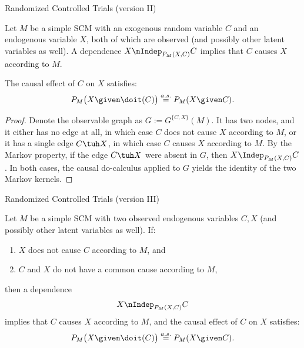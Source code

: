 \begin{frame}{Randomized Controlled Trials (version II)}
\begin{Prp}
Let $M$ be a simple SCM with an exogenous random variable $C$ and an endogenous 
variable $X$, both of which are observed (and possibly other latent variables as well).
A dependence 
  $X \nIndep_{P_{M}(X,C)} C $
implies that $C$ causes $X$ according to $M$.

The causal effect of $C$ on $X$ satisfies:
  $$P_{M}\big(X \given \doit(C)\big) \stackrel{a.s.}{=} P_{M}(X \given C).$$
\end{Prp}
\begin{proof}
Denote the observable graph as $G := G^{\{C,X\}}(M)$.
It has two nodes, and it either has no edge at all, in which case $C$ does not cause $X$ according to
$M$, or it has a single edge $C \tuh X$, in which case $C$ causes $X$ according to $M$.
By the Markov property, if the edge $C \tuh X$ were absent in $G$, 
then $X \Indep_{P_{M}(X,C)} C$. 
In both cases, the causal do-calculus applied to $G$ yields the identity of the two Markov kernels. 
\end{proof}
\end{frame}

\begin{frame}{Randomized Controlled Trials (version III)}
\begin{Prp}
Let $M$ be a simple SCM with two observed endogenous variables $C, X$
(and possibly other latent variables as well). If:
  \begin{enumerate}
    \item $X$ does not cause $C$ according to $M$, and
    \item $C$ and $X$ do not have a common cause according to $M$,
  \end{enumerate}
then a dependence 
  $$X \nIndep_{P_{M}(X,C)} C$$
  implies that $C$ causes $X$ according to $M$, and the causal effect of $C$ on $X$ satisfies:
  $$P_{M}\big(X \given \doit(C)\big) \stackrel{a.s.}{=} P_{M}(X \given C).$$
\end{Prp}
\end{frame}

